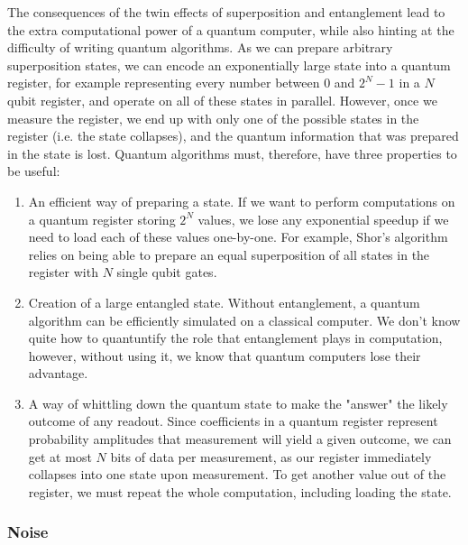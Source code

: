 The consequences of the twin effects of superposition and entanglement lead to the extra computational
power of a quantum computer, while also hinting at the difficulty of writing quantum algorithms. As we
can prepare arbitrary superposition states, we can encode an exponentially large
state into a quantum register, for example representing every number between 0 and $2^N-1$ in a $N$ qubit
register, and operate on all of these states in parallel. However, once we measure the register, we end up
with only one of the possible states in the register (i.e. the state collapses), and the quantum information
that was prepared in the state is lost. Quantum algorithms must, therefore, have three properties to be useful:
\begin{enumerate}
  \item An efficient way of preparing a state. If we want to perform computations on a quantum register
    storing $2^N$ values, we lose any exponential speedup if we need to load each of these values one-by-one.
    For example, Shor's algorithm relies on being able to prepare an equal superposition of all states
    in the register with $N$ single qubit gates\cite{PhysRevA.54.1034}.
  \item Creation of a large entangled state. Without entanglement, a quantum algorithm can be efficiently
    simulated on a classical computer. We don't know quite how to quantuntify the role that entanglement plays in computation,
    however, without using it, we know that quantum computers lose their advantage\cite{doi:10.1098/rspa.2002.1097}.
  \item A way of whittling down the quantum state to make the "answer" the likely outcome of any readout.
    Since coefficients in a quantum register represent probability amplitudes that measurement will yield
    a given outcome, we can get at most $N$ bits of data per measurement\cite{651037}, as our register
    immediately collapses into one state upon measurement. To get another value out of the register,
    we must repeat the whole computation, including loading the state.
\end{enumerate}

\subsubsection{Noise}

